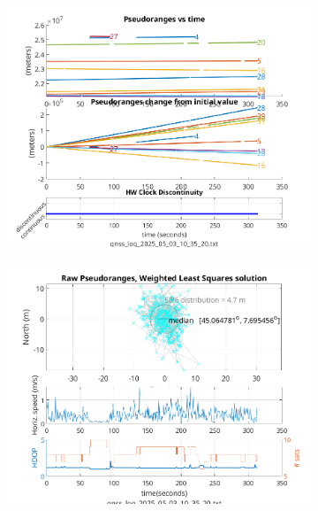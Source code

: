         \begin{figure}[h!]
            \centering
            \begin{subfigure}{0.23\textwidth}
                \includegraphics[width=\textwidth]{images/tests/Monte_Cappuccini/Spoofing/Samsung_A51_Monte_Cappuccini_fig1.png}
                \caption{}
            \end{subfigure}
            \hfill
            \begin{subfigure}{0.23\textwidth}
                \includegraphics[width=\textwidth]{images/tests/Monte_Cappuccini/Spoofing/Samsung_A51_Monte_Cappuccini_fig4.png}
                \caption{}
            \end{subfigure}
        \end{figure}


